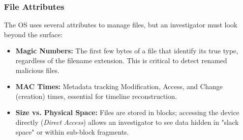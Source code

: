 \subsubsection{File Attributes}
The OS uses several attributes to manage files, but an investigator must look beyond the surface:
\begin{itemize}
    \item \textbf{Magic Numbers:} The first few bytes of a file that identify its true type, regardless of the filename extension. This is critical to detect renamed malicious files.
    \item \textbf{MAC Times:} Metadata tracking Modification, Access, and Change (creation) times, essential for timeline reconstruction.
    \item \textbf{Size vs. Physical Space:} Files are stored in blocks; accessing the device directly (\textit{Direct Access}) allows an investigator to see data hidden in "slack space" or within sub-block fragments.
\end{itemize}